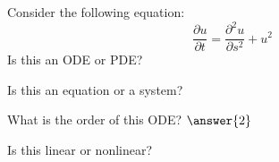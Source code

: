 \documentclass{ximera}
\begin{document}
\begin{exercise}
    Consider the following equation:  
    \[
        \frac{\partial u}{\partial t} = \frac{\partial^2 u}{\partial s^2} + u^2
    \]
    Is this an ODE or PDE?
    \begin{multipleChoice}
    \end{multipleChoice}
    \begin{problem}
        Is this an equation or a system?
        \begin{multipleChoice}
        \end{multipleChoice}
        
        \begin{problem}
            What is the order of this ODE? $\answer{2}$
            
            \begin{problem}
                Is this linear or nonlinear?
                \begin{multipleChoice}
                \end{multipleChoice}
                
%                    
            \end{problem}
        \end{problem}
    \end{problem}
\end{exercise}
\end{document}
